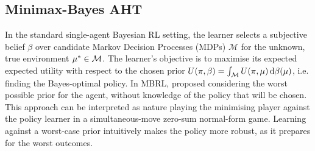 

\subsection{Minimax-Bayes AHT}
\label{subsec:minimax_bayes_aht}

In the standard single-agent Bayesian RL setting, the learner selects a subjective belief $\beta$ over candidate Markov Decision Processes (MDPs) $\mathcal{M}$ for the unknown, true environment $\mu^* \in \mathcal{M}$. The learner's objective is to maximise its expected expected utility with respect to the chosen prior $U(\pi, \beta) = \int_\mathcal{M} U(\pi, \mu) \mathop{}\!\mathrm{d} \beta(\mu)$, i.e. finding the Bayes-optimal policy. In MBRL, \citet{buening_minimax_bayes_reinforcement_2023} proposed considering the worst possible prior for the agent, without knowledge of the policy that will be chosen. This approach can be interpreted as nature playing the minimising player against the policy learner in a simultaneous-move zero-sum normal-form game. Learning against a worst-case prior intuitively makes the policy more robust, as it prepares for the worst outcomes.

